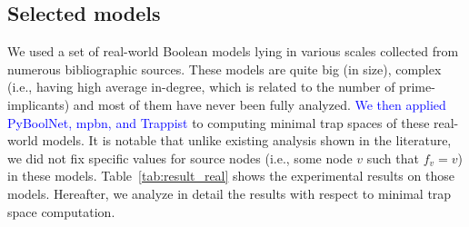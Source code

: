 \documentclass[runningheads]{llncs}
\newcommand{\revise}[1]{\textcolor{blue}{#1}}
\begin{document}
\subsection{Selected models}

We used a set of real-world Boolean models lying in various scales collected from numerous bibliographic sources.
These models are quite big (in size), complex (i.e., having high average in-degree, which is related to the number of prime-implicants) and most of them have never been fully analyzed.
\revise{We then applied PyBoolNet, mpbn, and Trappist} to computing minimal trap spaces of these real-world models.
It is notable that unlike existing analysis shown in the literature, we did not fix specific values for source nodes (i.e., some node \(v\) such that \(f_v = v\)) in these models.
Table~\ref{tab:result_real} shows the experimental results on those models. Hereafter, we analyze in detail the results with respect to minimal trap space computation.
\end{document}
